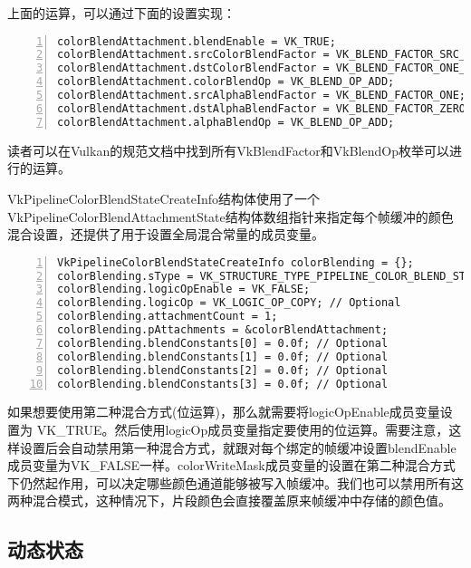 \documentclass{ctexart}
\begin{document}
上面的运算，可以通过下面的设置实现：

\begin{lstlisting}[language={[ANSI]C},keywordstyle=\color{blue!70},commentstyle=\color{red!50!green!50!blue!50},frame=shadowbox, rulesepcolor=\color{red!20!green!20!blue!20},basicstyle=\small,numbers=left, numberstyle=\tiny,breaklines=true]
colorBlendAttachment.blendEnable = VK_TRUE;
colorBlendAttachment.srcColorBlendFactor = VK_BLEND_FACTOR_SRC_ALPHA;
colorBlendAttachment.dstColorBlendFactor = VK_BLEND_FACTOR_ONE_MINUS_SRC_ALPHA;
colorBlendAttachment.colorBlendOp = VK_BLEND_OP_ADD;
colorBlendAttachment.srcAlphaBlendFactor = VK_BLEND_FACTOR_ONE;
colorBlendAttachment.dstAlphaBlendFactor = VK_BLEND_FACTOR_ZERO;
colorBlendAttachment.alphaBlendOp = VK_BLEND_OP_ADD;
\end{lstlisting}

读者可以在Vulkan的规范文档中找到所有VkBlendFactor和VkBlendOp枚举可以进行的运算。

VkPipelineColorBlendStateCreateInfo结构体使用了一个VkPipelineColorBlendAttachmentState结构体数组指针来指定每个帧缓冲的颜色混合设置，还提供了用于设置全局混合常量的成员变量。

\begin{lstlisting}[language={[ANSI]C},keywordstyle=\color{blue!70},commentstyle=\color{red!50!green!50!blue!50},frame=shadowbox, rulesepcolor=\color{red!20!green!20!blue!20},basicstyle=\small,numbers=left, numberstyle=\tiny,breaklines=true]
VkPipelineColorBlendStateCreateInfo colorBlending = {};
colorBlending.sType = VK_STRUCTURE_TYPE_PIPELINE_COLOR_BLEND_STATE_CREATE_INFO;
colorBlending.logicOpEnable = VK_FALSE;
colorBlending.logicOp = VK_LOGIC_OP_COPY; // Optional
colorBlending.attachmentCount = 1;
colorBlending.pAttachments = &colorBlendAttachment;
colorBlending.blendConstants[0] = 0.0f; // Optional
colorBlending.blendConstants[1] = 0.0f; // Optional
colorBlending.blendConstants[2] = 0.0f; // Optional
colorBlending.blendConstants[3] = 0.0f; // Optional
\end{lstlisting}

如果想要使用第二种混合方式(位运算)，那么就需要将logicOpEnable成员变量设置为 VK\_TRUE。然后使用logicOp成员变量指定要使用的位运算。需要注意，这样设置后会自动禁用第一种混合方式，就跟对每个绑定的帧缓冲设置blendEnable成员变量为VK\_FALSE一样。colorWriteMask成员变量的设置在第二种混合方式下仍然起作用，可以决定哪些颜色通道能够被写入帧缓冲。我们也可以禁用所有这两种混合模式，这种情况下，片段颜色会直接覆盖原来帧缓冲中存储的颜色值。

\subsection{动态状态}
\end{document}
